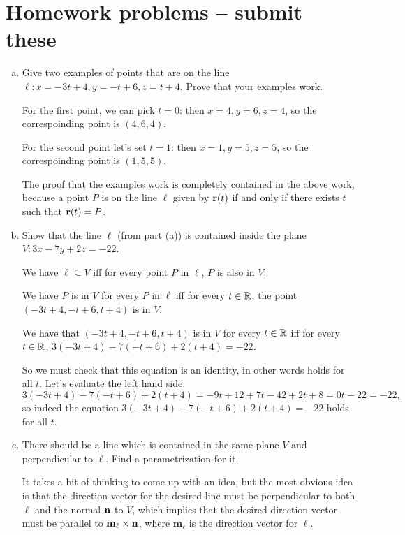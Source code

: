 \newpage

\section{Homework problems -- submit these}

\begin{problem}
  \leavevmode\begin{enumerate}[(a)]
    \item Give two examples of points that are on the line $\ell\colon x=-3t+4,y=-t+6,z=t+4$. Prove that your examples work.
    \begin{solution}
      For the first point, we can pick $t=0$: then $x=4,y=6,z=4$, so the correspoinding point is $(4,6,4)$.

      For the second point let's set $t=1$: then $x=1,y=5,z=5$, so the correspoinding point is $(1,5,5)$.

      The proof that the examples work is completely contained in the above work, because a point $P$ is on the line $\ell$ given by $\mathbf r(t)$ if and only if there exists $t$ such that $\mathbf r(t)=P$.
    \end{solution}
    \item Show that the line $\ell$ (from part (a)) is contained inside the plane $V\colon 3x-7y+2z=-22$.
    \begin{solution}
      We have $\ell\subseteq V$ iff for every point $P$ in $\ell$, $P$ is also in $V$.

      We have $P$ is in $V$ for every $P$ in $\ell$ iff for every $t\in\mathbb R$, the point $(-3t+4,-t+6,t+4)$ is in $V$.

      We have that $(-3t+4,-t+6,t+4)$ is in $V$ for every $t\in\mathbb R$ iff for every $t\in\mathbb R$, $3(-3t+4)-7(-t+6)+2(t+4)=-22$.

      So we must check that this equation is an identity, in other words holds for all $t$. Let's evaluate the left hand side:
      \[3(-3t+4)-7(-t+6)+2(t+4)=-9t+12+7t-42+2t+8=0t-22=-22,\]
      so indeed the equation $3(-3t+4)-7(-t+6)+2(t+4)=-22$ holds for all $t$.
    \end{solution}
    \item There should be a line which is contained in the same plane $V$ and perpendicular to $\ell$. Find a parametrization for it.
    \begin{solution}
      It takes a bit of thinking to come up with an idea, but the most obvious idea is that the direction vector for the desired line must be perpendicular to both $\ell$ and the normal $\mathbf n$ to $V$, which implies that the desired direction vector must be parallel to $\mathbf m_\ell\times\mathbf n$, where $\mathbf m_\ell$ is the direction vector for $\ell$.


\end{solution}
\end{enumerate}
\end{problem}
